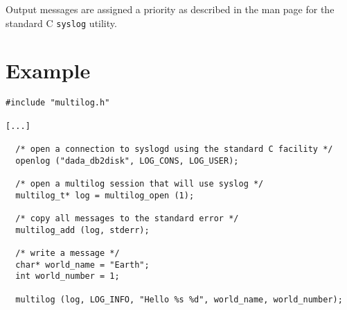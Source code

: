 Output messages are assigned a priority as described in the man page
for the standard C {\tt syslog} utility.

\section{Example}

\begin{verbatim}
#include "multilog.h"

[...]

  /* open a connection to syslogd using the standard C facility */
  openlog ("dada_db2disk", LOG_CONS, LOG_USER);

  /* open a multilog session that will use syslog */
  multilog_t* log = multilog_open (1);

  /* copy all messages to the standard error */
  multilog_add (log, stderr);

  /* write a message */
  char* world_name = "Earth";
  int world_number = 1;

  multilog (log, LOG_INFO, "Hello %s %d", world_name, world_number);
\end{verbatim}
